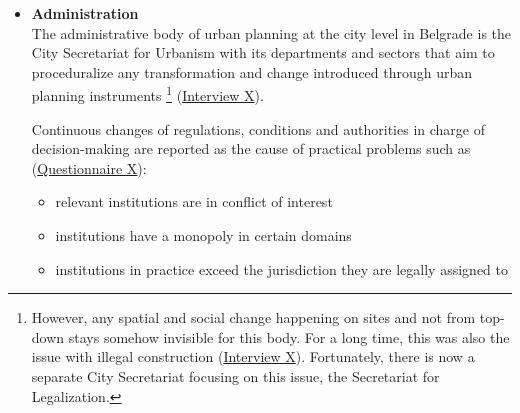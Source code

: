 \documentclass[11pt]{report}
\begin{document}
{{{{\begin{itemize}
On the other hand, the not up-to-date practice of urban planning in Serbia also contributes to  the marketization of planning domains and the expansion of foreign influences that do not fall under any evaluating procedures. This was the case with the urban design and construction solutions for BWP. The practice of copying European documents and experiences without a critical perspective and important adjustments to local traditions and context, as well as introducing international experts directly into the local field for interventions, are very present in Serbia. More often than not, political powers directly interfere in planning and decide and communicate with foreign professionals without consulting local scientific and professional communities. Such practices contribute to controversial rather than progressive foreign influences. They are not properly translated to the situation in Serbia and, in this manner, create more room for misconduct than for its prevention (\href{Vujosevic}{\citealt{vujosevic_collapse_2010}}).
\\

\item \textbf{Administration}
\\
The administrative body of urban planning at the city level in Belgrade is the City Secretariat for Urbanism with its departments and sectors that aim to proceduralize any transformation and change introduced through urban planning instruments
\footnote{However, any spatial and social change happening on sites and not from top-down stays somehow invisible for this body. For a long time, this was also the issue with illegal construction (\href{InterviewX}{Interview X}).
Fortunately, there is now a separate City Secretariat focusing on this issue, the Secretariat for Legalization.}
(\href{InterviewX}{Interview X}).

Continuous changes of regulations, conditions and authorities in charge of decision-making are reported as the cause of practical problems such as (\href{Questionnaire Experts Post-socialist}{Questionnaire X}):

\begin{itemize}
\item relevant institutions are in conflict of interest %
\item institutions have a monopoly in certain domains %
\item institutions in practice exceed the jurisdiction they are legally assigned to %
\end{itemize}


\end{itemize}}}}}
\end{document}

